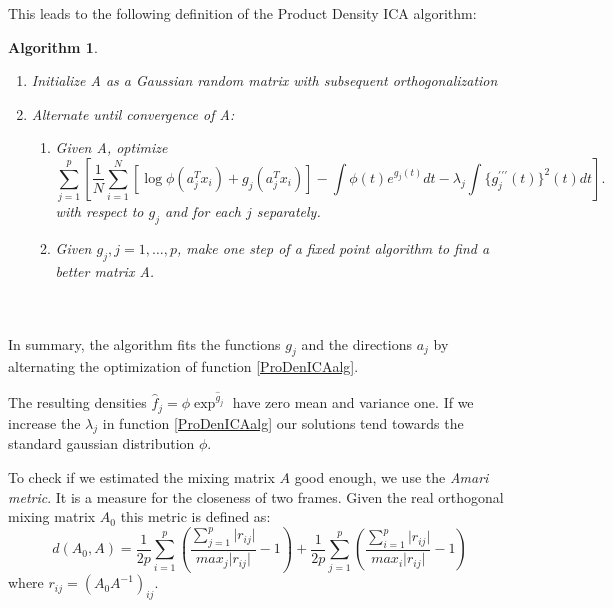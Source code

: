 \documentclass[12pt, a4paper]{article}
\newtheorem{Algorithm}[Theorem]{Algorithm}
\numberwithin{equation}{section}
\numberwithin{figure}{section}
\numberwithin{table}{section}
\begin{document}
	This leads to the following definition of the Product Density ICA algorithm:\\
	
	\begin{minipage}{\textwidth}
		\begin{Algorithm} \label{Algorithm}
			\hspace{0.5cm}
			\begin{enumerate}
				\item Initialize A as a Gaussian random matrix with subsequent orthogonalization
				\item Alternate until convergence of A:
				\begin{enumerate}
					\item Given A, optimize
					\begin{equation}\label{ProDenICAalg}
					\sum_{j=1}^p[\frac 1 N \sum_{i=1}^N[\log\phi(a_j^Tx_i)+g_j(a_j^Tx_i)]-\int\phi(t)e^{g_j(t)}dt - \lambda_j\int\{g_j^{\prime\prime\prime}(t)\}^2(t)dt].
					\end{equation}
					with respect to \mbox{$g_j$} and for each $j$ separately.
					\item Given \mbox{$g_j, j = 1, \dots, p$}, make one step of a fixed point algorithm to find a better matrix A.
				\end{enumerate}
			\end{enumerate}
		\end{Algorithm}
	\end{minipage}\\~\\
	
	
	In summary, the algorithm fits the functions \mbox{$g_j$} and the directions \mbox{$a_j$} by alternating the optimization of function \ref{ProDenICAalg}.
	
	The resulting densities \mbox{$\hat{f}_j=\phi \exp ^{\hat{g}_j}$} have zero mean and variance one. %
	If we increase the \mbox{$\lambda_j$} in function \ref{ProDenICAalg} our solutions tend towards the standard gaussian distribution \mbox{$\phi$}.
	
	To check if we estimated the mixing matrix $A$ good enough, we use the \textit{Amari metric}.
	It is a measure for the closeness of two frames.
	Given the real orthogonal mixing matrix \mbox{$A_0$} this metric is defined as:
	\begin{equation}
	d(A_0,A)=\frac{1}{2p}\sum_{i=1}^{p}\left( \frac{\sum_{j=1}^{p} \vert r_{ij} \vert}{max_j \vert r_{ij} \vert}-1 \right) +\frac{1}{2p}\sum_{j=1}^{p}\left( \frac{\sum_{i=1}^{p} \vert r_{ij} \vert}{max_i \vert r_{ij} \vert}-1\right)
	\end{equation}
	where \mbox{$r_{ij}=(A_0A^{-1})_{ij}$}.
	
\end{document}
